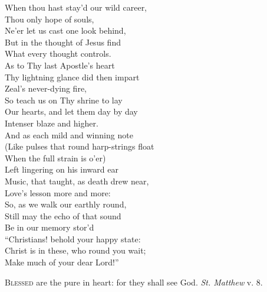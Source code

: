 When thou hast stay’d our wild career, \\
 Thou only hope of souls, \\
 Ne’er let us cast one look behind, \\
 But in the thought of Jesus find \\
 What every thought controls. \\
  As to Thy last Apostle’s heart \\
 Thy lightning glance did then impart \\
 Zeal’s never-dying fire, \\
 So teach us on Thy shrine to lay \\
 Our hearts, and let them day by day \\
 Intenser blaze and higher. \\
  And as each mild and winning note \\
 (Like pulses that round harp-strings float \\
 When the full strain is o’er) \\
 Left lingering on his inward ear \\
 Music, that taught, as death drew near, \\
 Love’s lesson more and more: \\
  So, as we walk our earthly round, \\
 Still may the echo of that sound \\
 Be in our memory stor’d \\
 “Christians! behold your happy state: \\
 Christ is in these, who round you wait; \\
 Make much of your dear Lord!”\\


\textsc{Blessed} are the pure in heart: for they shall see God. \emph{St. Matthew} v. 8.

